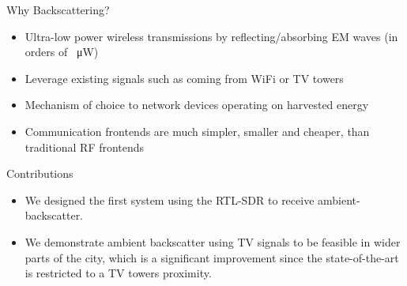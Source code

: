 \documentclass[apectratio=169]{beamer}
\begin{document}
\begin{frame}{Why Backscattering?}
	\begin{itemize}
		\item<1-> Ultra-low power wireless transmissions by reflecting/absorbing EM waves (in orders of \SI{}{\micro\watt}) \cite{liu_ambient_2013}
		\item<2-> Leverage existing signals such as coming from WiFi \cite{hitchhike,kellogg2015wi} or TV towers \cite{liu_ambient_2013,parks_turbocharging_2014}
		\item<3-> Mechanism of choice to network devices operating on harvested energy
		\item<4-> Communication frontends are much simpler, smaller and cheaper, than traditional RF frontends
	\end{itemize}
\end{frame}

\begin{frame}{Contributions}
	\begin{itemize}
		\item<1-> We designed the first system using the RTL-SDR to receive ambient-backscatter.
		\item<2-> We demonstrate ambient backscatter using TV signals to be feasible in wider parts of the city, which is a significant improvement since the state-of-the-art is restricted to a TV towers proximity. 
	\end{itemize}
\end{frame}
\end{document}
